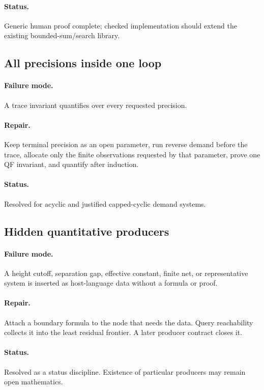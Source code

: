 \paragraph{Status.}
Generic human proof complete; checked implementation should extend the existing bounded-sum/search library.

\subsection{All precisions inside one loop}

\paragraph{Failure mode.}
A trace invariant quantifies over every requested precision.

\paragraph{Repair.}
Keep terminal precision as an open parameter, run reverse demand before the trace, allocate only the finite observations requested by that parameter, prove one QF invariant, and quantify after induction.

\paragraph{Status.}
Resolved for acyclic and justified capped-cyclic demand systems.

\subsection{Hidden quantitative producers}

\paragraph{Failure mode.}
A height cutoff, separation gap, effective constant, finite net, or representative system is inserted as host-language data without a formula or proof.

\paragraph{Repair.}
Attach a boundary formula to the node that needs the data.  Query reachability collects it into the least residual frontier.  A later producer contract closes it.

\paragraph{Status.}
Resolved as a status discipline.  Existence of particular producers may remain open mathematics.

